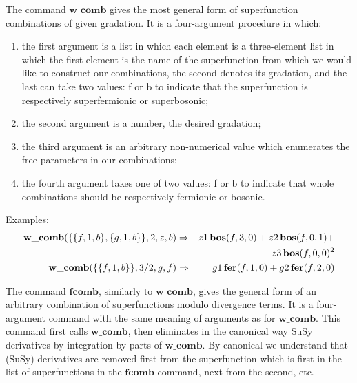 {The command $\mathbf{w\_comb}$ gives the most general form of
superfunction combinations of given gradation.  It is a four-argument
procedure in which:
\begin{enumerate}
\item the first argument is a list in which each element is a
  three-element list in which the first element is the name of the
  superfunction from which we would like to construct our combinations,
  the second denotes its gradation, and the last can take two values:
  f or b to indicate that the superfunction is respectively
  superfermionic or superbosonic;
\item the second argument is a number, the desired gradation;
\item the third argument is an arbitrary non-numerical value which
  enumerates the free parameters in our combinations;
\item the fourth argument takes one of two values: f or b to indicate
  that whole combinations should be respectively fermionic or bosonic.
\end{enumerate}

Examples:
\begin{eqnarray*}
  \mathbf{w\_comb}(\{\{ f,1,b \},\{g,1,b\}\},2,z,b) &\Rightarrow&
  z1\,\mathbf{bos}(f,3,0) + z2\,\mathbf{bos}(f,0,1) + \\
  &&z3\,\mathbf{bos}(f,0,0)^2 \\
  \mathbf{w\_comb}(\{\{ f,1,b\}\},3/2,g,f) &\Rightarrow&
  g1\,\mathbf{fer}(f,1,0) + g2\,\mathbf{fer}(f,2,0)
\end{eqnarray*}

The command $\mathbf{fcomb}$, similarly to $\mathbf{w\_comb}$, gives
the general form of an arbitrary combination of superfunctions modulo
divergence terms.  It is a four-argument command with the same meaning
of arguments as for $\mathbf{w\_comb}$.  This command first calls
$\mathbf{w\_comb}$, then eliminates in the canonical way SuSy
derivatives by integration by parts of $\mathbf{w\_comb}$.  By
canonical we understand that (SuSy) derivatives are removed first from
the superfunction which is first in the list of superfunctions in the
$\mathbf{fcomb}$ command, next from the second, etc.

}

